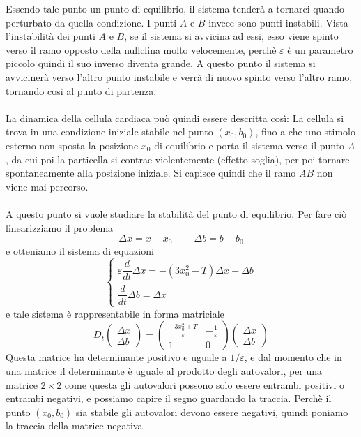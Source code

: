 \documentclass[12pt]{article}
\begin{document}
Essendo tale punto un punto di equilibrio, il sistema tenderà a tornarci quando perturbato da quella condizione. I punti $A$ e $B$ invece sono punti instabili. Vista l'instabilità dei punti $A$ e $B$, se il sistema si avvicina ad essi, esso viene spinto verso il ramo opposto della nullclina molto velocemente, perchè $\varepsilon$ è un parametro piccolo quindi il suo inverso diventa grande. A questo punto il sistema si avvicinerà verso l'altro punto instabile e verrà di nuovo spinto verso l'altro ramo, tornando così al punto di partenza. \\ \\
La dinamica della cellula cardiaca può quindi essere descritta così: La cellula si trova in una condizione iniziale stabile nel punto $(x_0,b_0)$, fino a che uno stimolo esterno non sposta la posizione $x_0$ di equilibrio e porta il sistema verso il punto $A$, da cui poi la particella si contrae violentemente (effetto soglia), per poi tornare spontaneamente alla posizione iniziale. Si capisce quindi che il ramo $AB$ non viene mai percorso. \\ \\
A questo punto si vuole studiare la stabilità del punto di equilibrio. Per fare ciò linearizziamo il problema
$$
	\Delta x = x - x_0 \ \ \ \ \ \ \ \ \ \ \Delta b = b - b_0
$$
e otteniamo il sistema di equazioni
\begin{equation}
	\begin{cases}
		\varepsilon\dfrac{d}{dt}\Delta x = -(3x_0^2 - T)\Delta x - \Delta b \\
		\dfrac{d}{dt} \Delta b = \Delta x
	\end{cases}
\end{equation}
e tale sistema è rappresentabile in forma matriciale
\begin{equation}
	D_t \begin{pmatrix}
		\Delta x \\
		\Delta b
	\end{pmatrix} = \begin{pmatrix}
	\frac{-3x_0^2 + T}{\varepsilon} & -\frac{1}{\varepsilon} \\
	1 & 0
\end{pmatrix} \begin{pmatrix}
	\Delta x \\
	\Delta b
\end{pmatrix}
\end{equation}
Questa matrice ha determinante positivo e uguale a $1/\varepsilon$, e dal momento che in una matrice il determinante è uguale al prodotto degli autovalori, per una matrice $2\times 2$ come questa gli autovalori possono solo essere entrambi positivi o entrambi negativi, e possiamo capire il segno guardando la traccia. Perchè il punto $(x_0,b_0)$ sia stabile gli autovalori devono essere negativi, quindi poniamo la traccia della matrice negativa
\end{document}
